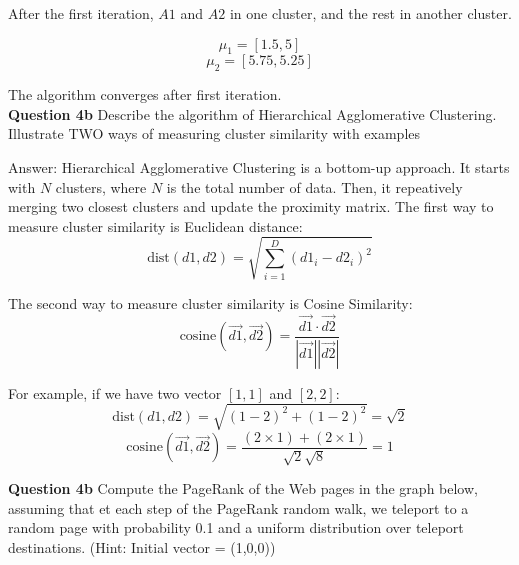 \documentclass[11pt,a4paper]{report}
\begin{document}
\begin{multicols*}{2}

\noindent After the first iteration, $A1$ and $A2$ in one cluster, and the rest in another cluster.

$$\mu_1 = [1.5,5]$$
$$\mu_2 = [5.75, 5.25]$$


\noindent The algorithm converges after first iteration. \\

\noindent \textbf{Question 4b} Describe the algorithm of Hierarchical Agglomerative Clustering. Illustrate TWO ways of measuring cluster similarity with examples

\noindent Answer: Hierarchical Agglomerative Clustering is a bottom-up approach. It starts with $N$ clusters, where $N$ is the total number of data. Then, it repeatively merging two closest clusters and update the proximity matrix. The first way to measure cluster similarity is Euclidean distance:
$$\text{dist}(d1,d2)=\sqrt{\sum_{i=1}^D (d1_{i} - d2_{i})^2}$$

\noindent The second way to measure cluster similarity is Cosine Similarity:
$$\text{cosine}(\vec{d1},\vec{d2}) = \frac{\vec{d1} \cdot \vec{d2}}{|\vec{d1}||\vec{d2}|}$$

\noindent For example, if we have two vector $[1,1]$ and $[2,2]$:
$$\text{dist}(d1,d2)=\sqrt{(1-2)^2 + (1-2)^2} = \sqrt{2}$$
$$\text{cosine}(\vec{d1},\vec{d2}) = \frac{(2\times 1) + (2\times 1)}{\sqrt{2}\sqrt{8}} = 1$$

\noindent \textbf{Question 4b} Compute the PageRank of the Web pages in the graph below, assuming that et each step of the PageRank random walk, we teleport to a random page with probability 0.1 and a uniform distribution over teleport destinations. (Hint: Initial vector = (1,0,0))


\end{multicols*}
\end{document}
